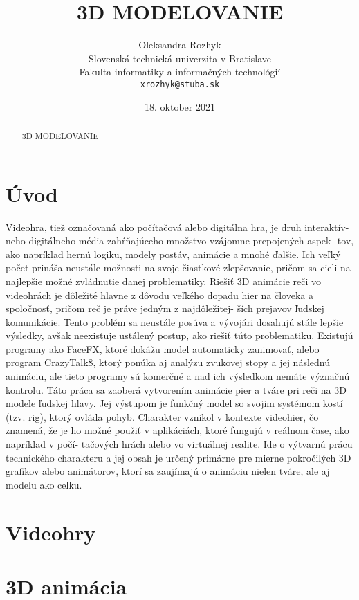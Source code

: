 \documentclass[10pt,twoside,slovak,a4paper]{article}
\title{3D MODELOVANIE}
\author{Oleksandra Rozhyk\\[2pt]
	{\small Slovenská technická univerzita v Bratislave}\\
	{\small Fakulta informatiky a informačných technológií}\\
	{\small \texttt{xrozhyk@stuba.sk}}
	}
\date{\small 18. oktober 2021} %
\begin{document}
\maketitle

\begin{abstract}
\centering 3D MODELOVANIE
\end{abstract}



\section{Úvod}

Videohra, tiež označovaná ako počítačová alebo digitálna hra, je druh interaktív- neho digitálneho média zahŕňajúceho množstvo vzájomne prepojených aspek- tov, ako napríklad hernú logiku, modely postáv, animácie a mnohé ďalšie. Ich veľký počet prináša neustále možnosti na svoje čiastkové zlepšovanie, pričom sa cieli na najlepšie možné zvládnutie danej problematiky.
Riešiť 3D animácie reči vo videohrách je dôležité hlavne z dôvodu veľkého dopadu hier na človeka a spoločnosť, pričom reč je práve jedným z najdôležitej- ších prejavov ľudskej komunikácie. Tento problém sa neustále posúva a vývojári dosahujú stále lepšie výsledky, avšak neexistuje ustálený postup, ako riešiť túto problematiku.
Existujú programy ako FaceFX, ktoré dokážu model automaticky zanimovať, alebo program CrazyTalk8, ktorý ponúka aj analýzu zvukovej stopy a jej následnú animáciu, ale tieto programy sú komerčné a nad ich výsledkom nemáte význačnú kontrolu.
Táto práca sa zaoberá vytvorením animácie pier a tváre pri reči na 3D modele ľudskej hlavy. Jej výstupom je funkčný model so svojim systémom kostí (tzv. rig), ktorý ovláda pohyb. Charakter vznikol v kontexte videohier, čo znamená, že je ho možné použiť v aplikáciách, ktoré fungujú v reálnom čase, ako napríklad v počí- tačových hrách alebo vo virtuálnej realite.
Ide o výtvarnú prácu technického charakteru a jej obsah je určený primárne pre mierne pokročilých 3D grafikov alebo animátorov, ktorí sa zaujímajú o animáciu nielen tváre, ale aj modelu ako celku.


\section{Videohry}

\section{3D animácia} \label{ina}
\end{document}
